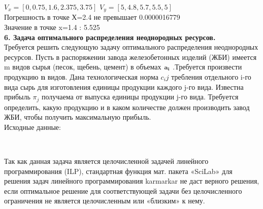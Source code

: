 \documentclass[russian,utf8,nocolumnxxxi,nocolumnxxxii]{eskdtext}
\begin{document}
$V_{x}=[0,0.75,1.6,2.375,3.75]$
$V_{y}=[5,4.8,5.7,5.5,5]$\\
Погрешность в точке Х=2.4 не превышает 0.0000016779\\
Значение в точке x=1.4 : 5.525 
\newpage
\begin{equation}\label{6}
\end{equation}
{\bf6. Задача оптимального распределения неоднородных ресурсов.}\\
Требуется решить следующую задачу оптимального распределения неоднородных ресурсов. Пусть в распоряжении завода железобетонных изделий (ЖБИ) имеется m видов сырья (песок, щебень, цемент) в объемах ${\bf a_i}$  .Требуется произвести продукцию {\bf n} видов. Дана технологическая норма $c_ij$  требления отдельного i-го вида сырь для изготовления единицы продукции каждого j-го вида. Известна прибыль $\pi_j$  получаема от выпуска единицы продукции j-го вида. Требуется определить, какую продукцию и в каком количестве должен производить завод ЖБИ, чтобы получить максимальную прибыль.\\
Исходные данные:\\
\begin{figure}[H]
\begin{center}
\begin{minipage}[h]{0.65\linewidth}
  \\
\end{minipage}
\end{center}
\end{figure}
Так как данная задача является целочисленной задачей линейного программирования (ILP), стандартная функция мат. пакета «SciLab» для решения задач линейного программирования karmarkar не даст верного решения, если оптимальное решение для соответствующей задачи без целочисленного ограничения не является целочисленным или «близким» к нему.
\end{document}
